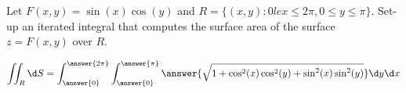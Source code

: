 \documentclass{ximera}
\author{Gregory Hartman \and Bart Snapp}
\begin{document}
\begin{exercise}
Let $F(x,y) = \sin(x)\cos(y)$ and $R = \{(x,y):0 le x \le 2\pi, 0\le
y\le \pi\}$. Set-up an iterated integral that computes the surface
area of the surface $z=F(x,y)$ over $R$.
\begin{prompt}
  \[
  \iint_R \d S = \int_{\answer{0}}^{\answer{2\pi}} \int_{\answer{0}}^{\answer{\pi}} \answer{\sqrt{1+\cos^2(x)\cos^2(y) + \sin^2(x)\sin^2(y)}}\d y \d x
  \]
\end{prompt}
\end{exercise}
\end{document}
